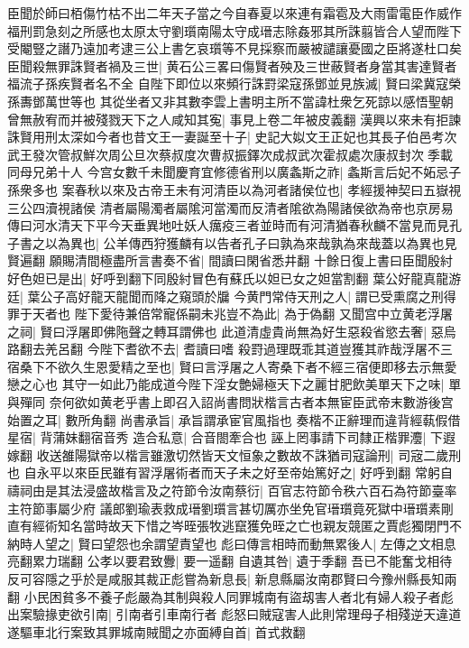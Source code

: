 臣聞於師曰栢傷竹枯不出二年天子當之今自春夏以來連有霜雹及大雨雷電臣作威作福刑罰急刻之所感也太原太守劉瓆南陽太守成瑨志除姦邪其所誅翦皆合人望而陛下受閹豎之譖乃遠加考逮三公上書乞哀瓆等不見採察而嚴被譴讓憂國之臣將遂杜口矣臣聞殺無罪誅賢者禍及三世|{
	黄石公三畧曰傷賢者殃及三世蔽賢者身當其害達賢者福流子孫疾賢者名不全}
自陛下即位以來頻行誅罸梁寇孫鄧並見族滅|{
	賢曰梁冀寇榮孫夀鄧萬世等也}
其從坐者又非其數李雲上書明主所不當諱杜衆乞死諒以感悟聖朝曾無赦宥而并被殘戮天下之人咸知其寃|{
	事見上卷二年被皮義翻}
漢興以來未有拒諫誅賢用刑太深如今者也昔文王一妻誕至十子|{
	史記大姒文王正妃也其長子伯邑考次武王發次管叔鮮次周公旦次蔡叔度次曹叔振鐸次成叔武次霍叔處次康叔封次季載同母兄弟十人}
今宫女數千未聞慶育宜修德省刑以廣螽斯之祚|{
	螽斯言后妃不妬忌子孫衆多也}
案春秋以來及古帝王未有河清臣以為河者諸侯位也|{
	孝經援神契曰五嶽視三公四瀆視諸侯}
清者屬陽濁者屬隂河當濁而反清者隂欲為陽諸侯欲為帝也京房易傳曰河水清天下平今天垂異地吐妖人癘疫三者並時而有河清猶春秋麟不當見而見孔子書之以為異也|{
	公羊傳西狩獲麟有以告者孔子曰孰為來哉孰為來哉蓋以為異也見賢遍翻}
願賜清間極盡所言書奏不省|{
	間讀曰閑省悉井翻}
十餘日復上書曰臣聞殷紂好色妲已是出|{
	好呼到翻下同殷紂冒色有蘇氏以妲已女之妲當割翻}
葉公好龍真龍游廷|{
	葉公子高好龍天龍聞而降之窺頭於牖}
今黄門常侍天刑之人|{
	謂已受熏腐之刑得罪于天者也}
陛下愛待兼倍常寵係嗣未兆豈不為此|{
	為于偽翻}
又聞宫中立黄老浮屠之祠|{
	賢曰浮屠即佛陁聲之轉耳謂佛也}
此道清虛貴尚無為好生惡殺省慾去奢|{
	惡烏路翻去羌呂翻}
今陛下耆欲不去|{
	耆讀曰嗜}
殺罸過理既乖其道豈獲其祚哉浮屠不三宿桑下不欲久生恩愛精之至也|{
	賢曰言浮屠之人寄桑下者不經三宿便即移去示無愛戀之心也}
其守一如此乃能成道今陛下淫女艶婦極天下之麗甘肥飲美單天下之味|{
	單與殫同}
奈何欲如黄老乎書上即召入詔尚書問狀楷言古者本無宦臣武帝末數游後宫始置之耳|{
	數所角翻}
尚書承旨|{
	承旨謂承宦官風指也}
奏楷不正辭理而違背經蓻假借星宿|{
	背蒲妹翻宿音秀}
造合私意|{
	合音閤牽合也}
誣上罔事請下司隸正楷罪灋|{
	下遐嫁翻}
收送雒陽獄帝以楷言雖激切然皆天文恒象之數故不誅猶司寇論刑|{
	司宼二歲刑也}
自永平以來臣民雖有習浮屠術者而天子未之好至帝始篤好之|{
	好呼到翻}
常躬自禱祠由是其法浸盛故楷言及之符節令汝南蔡衍|{
	百官志符節令秩六百石為符節臺率主符節事屬少府}
議郎劉瑜表救成瑨劉瓆言甚切厲亦坐免官瑨瓆竟死獄中瑨瓆素剛直有經術知名當時故天下惜之岑晊張牧逃竄獲免晊之亡也親友競匿之賈彪獨閉門不納時人望之|{
	賢曰望怨也余謂望責望也}
彪曰傳言相時而動無累後人|{
	左傳之文相息亮翻累力瑞翻}
公孝以要君致釁|{
	要一遥翻}
自遺其咎|{
	遺于季翻}
吾已不能奮戈相待反可容隱之乎於是咸服其裁正彪嘗為新息長|{
	新息縣屬汝南郡賢曰今豫州縣長知兩翻}
小民困貧多不養子彪嚴為其制與殺人同罪城南有盜刼害人者北有婦人殺子者彪出案驗掾吏欲引南|{
	引南者引車南行者}
彪怒曰賊寇害人此則常理母子相殘逆天違道遂驅車北行案致其罪城南賊聞之亦面縛自首|{
	首式救翻}
